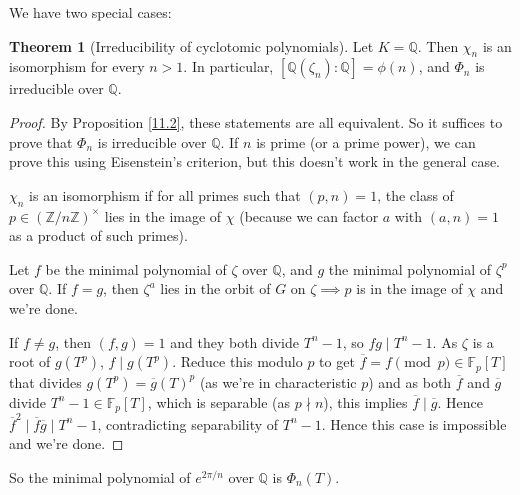\documentclass{article}
\theoremstyle{definition}
\newtheorem{theorem}{Theorem}[section]
\begin{document}
We have two special cases:
\begin{theorem}[Irreducibility of cyclotomic polynomials]
    Let $K=\mathbb{Q}$. Then $\chi_n$ is an isomorphism for every $n>1$. In particular, $[\mathbb{Q}(\zeta_n):\mathbb{Q}]=\phi(n)$, and $\Phi_n$ is irreducible over $\mathbb{Q}$.
\end{theorem}
\begin{proof}
    By Proposition \ref{11.2}, these statements are all equivalent. So it suffices to prove that $\Phi_n$ is irreducible over $\mathbb{Q}$. If $n$ is prime (or a prime power), we can prove this using Eisenstein's criterion, but this doesn't work in the general case.

    $\chi_n$ is an isomorphism if for all primes such that $(p,n)=1$, the class of $p \in (\mathbb{Z}/n\mathbb{Z})^\times$ lies in the image of $\chi$ (because we can factor $a$ with $(a,n)=1$ as a product of such primes).

    Let $f$ be the minimal polynomial of $\zeta$ over $\mathbb{Q}$, and $g$ the minimal polynomial of $\zeta^p$ over $\mathbb{Q}$. If $f=g$, then $\zeta^a$ lies in the orbit of $G$ on $\zeta \implies p$ is in the image of $\chi$ and we're done.

    If $f\neq g$, then $(f,g)=1$ and they both divide $T^n-1$, so $fg \mid T^n-1$. As $\zeta$ is a root of $g(T^p)$, $f \mid g(T^p)$. Reduce this modulo $p$ to get $\overline{f} = f \pmod{p} \in \mathbb{F}_p[T]$ that divides $g(T^p) = \overline{g}(T)^p$ (as we're in characteristic $p$) and as both $\overline{f}$ and $\overline{g}$ divide $T^n-1 \in \mathbb{F}_p[T]$, which is separable (as $p \nmid n$), this implies $\overline{f} \mid \overline{g}$. Hence $\overline{f}^2 \mid \overline{f}\overline{g} \mid T^n-1$, contradicting separability of $T^n-1$. Hence this case is impossible and we're done.
\end{proof}
So the minimal polynomial of $e^{2\pi/n}$ over $\mathbb{Q}$ is $\Phi_n(T)$.

\end{document}
